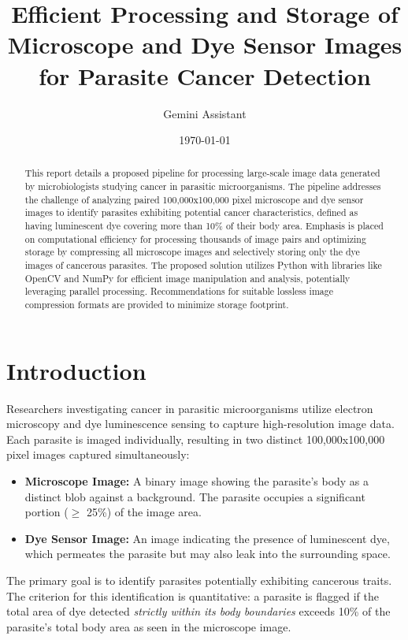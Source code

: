 \documentclass{article}
\title{Efficient Processing and Storage of Microscope and Dye Sensor Images for Parasite Cancer Detection}
\author{Gemini Assistant}
\date{\today} %
\begin{document}
\maketitle

\begin{abstract}
This report details a proposed pipeline for processing large-scale image data generated by microbiologists studying cancer in parasitic microorganisms. The pipeline addresses the challenge of analyzing paired 100,000x100,000 pixel microscope and dye sensor images to identify parasites exhibiting potential cancer characteristics, defined as having luminescent dye covering more than 10\% of their body area. Emphasis is placed on computational efficiency for processing thousands of image pairs and optimizing storage by compressing all microscope images and selectively storing only the dye images of cancerous parasites. The proposed solution utilizes Python with libraries like OpenCV and NumPy for efficient image manipulation and analysis, potentially leveraging parallel processing. Recommendations for suitable lossless image compression formats are provided to minimize storage footprint.
\end{abstract}

\section{Introduction}
Researchers investigating cancer in parasitic microorganisms utilize electron microscopy and dye luminescence sensing to capture high-resolution image data. Each parasite is imaged individually, resulting in two distinct 100,000x100,000 pixel images captured simultaneously:
\begin{itemize}
    \item \textbf{Microscope Image:} A binary image showing the parasite's body as a distinct blob against a background. The parasite occupies a significant portion ($\ge$ 25\%) of the image area.
    \item \textbf{Dye Sensor Image:} An image indicating the presence of luminescent dye, which permeates the parasite but may also leak into the surrounding space.
\end{itemize}
The primary goal is to identify parasites potentially exhibiting cancerous traits. The criterion for this identification is quantitative: a parasite is flagged if the total area of dye detected \textit{strictly within its body boundaries} exceeds 10\% of the parasite's total body area as seen in the microscope image.
\end{document}

